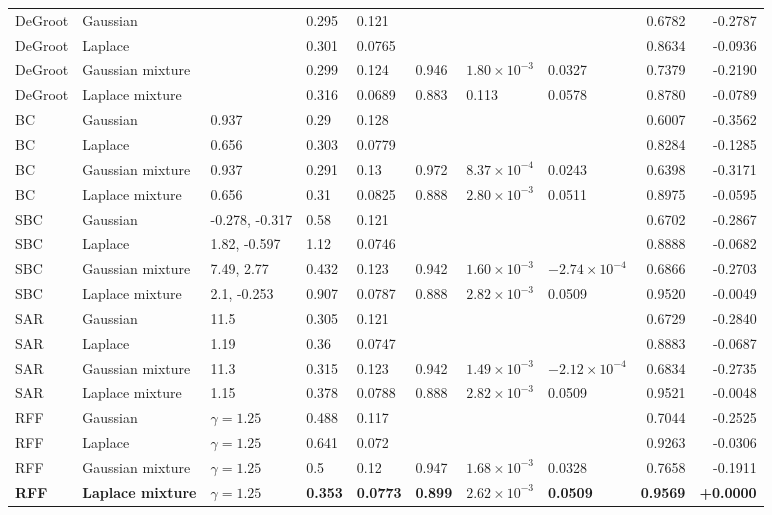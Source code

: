\begin{longtable}{llllllllrr}
DeGroot & Gaussian &  & 0.295 & 0.121 &  &  &  & 0.6782 & -0.2787 \\
DeGroot & Laplace &  & 0.301 & 0.0765 &  &  &  & 0.8634 & -0.0936 \\
DeGroot & Gaussian mixture &  & 0.299 & 0.124 & 0.946 & $1.80\times10^{-3}$ & 0.0327 & 0.7379 & -0.2190 \\
DeGroot & Laplace mixture &  & 0.316 & 0.0689 & 0.883 & 0.113 & 0.0578 & 0.8780 & -0.0789 \\
BC & Gaussian & 0.937 & 0.29 & 0.128 &  &  &  & 0.6007 & -0.3562 \\
BC & Laplace & 0.656 & 0.303 & 0.0779 &  &  &  & 0.8284 & -0.1285 \\
BC & Gaussian mixture & 0.937 & 0.291 & 0.13 & 0.972 & $8.37\times10^{-4}$ & 0.0243 & 0.6398 & -0.3171 \\
BC & Laplace mixture & 0.656 & 0.31 & 0.0825 & 0.888 & $2.80\times10^{-3}$ & 0.0511 & 0.8975 & -0.0595 \\
SBC & Gaussian & -0.278, -0.317 & 0.58 & 0.121 &  &  &  & 0.6702 & -0.2867 \\
SBC & Laplace & 1.82, -0.597 & 1.12 & 0.0746 &  &  &  & 0.8888 & -0.0682 \\
SBC & Gaussian mixture & 7.49, 2.77 & 0.432 & 0.123 & 0.942 & $1.60\times10^{-3}$ & $-2.74\times10^{-4}$ & 0.6866 & -0.2703 \\
SBC & Laplace mixture & 2.1, -0.253 & 0.907 & 0.0787 & 0.888 & $2.82\times10^{-3}$ & 0.0509 & 0.9520 & -0.0049 \\
SAR & Gaussian & 11.5 & 0.305 & 0.121 &  &  &  & 0.6729 & -0.2840 \\
SAR & Laplace & 1.19 & 0.36 & 0.0747 &  &  &  & 0.8883 & -0.0687 \\
SAR & Gaussian mixture & 11.3 & 0.315 & 0.123 & 0.942 & $1.49\times10^{-3}$ & $-2.12\times10^{-4}$ & 0.6834 & -0.2735 \\
SAR & Laplace mixture & 1.15 & 0.378 & 0.0788 & 0.888 & $2.82\times10^{-3}$ & 0.0509 & 0.9521 & -0.0048 \\
RFF & Gaussian & $\gamma=1.25$ & 0.488 & 0.117 &  &  &  & 0.7044 & -0.2525 \\
RFF & Laplace & $\gamma=1.25$ & 0.641 & 0.072 &  &  &  & 0.9263 & -0.0306 \\
RFF & Gaussian mixture & $\gamma=1.25$ & 0.5 & 0.12 & 0.947 & $1.68\times10^{-3}$ & 0.0328 & 0.7658 & -0.1911 \\
\textbf{RFF} & \textbf{Laplace mixture} & \textbf{$\gamma=1.25$} & \textbf{0.353} & \textbf{0.0773} & \textbf{0.899} & \textbf{$2.62\times10^{-3}$} & \textbf{0.0509} & \textbf{0.9569} & \textbf{+0.0000} \\

\end{longtable}
